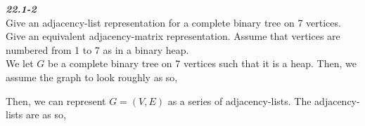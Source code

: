 \documentclass{article}
\begin{document}
\textbf{\textit{22.1-2}}\\
Give an adjacency-list representation for a complete binary tree on 7 vertices. Give
an equivalent adjacency-matrix representation. Assume that vertices are numbered
from 1 to 7 as in a binary heap.\\

We let $G$ be a complete binary tree on 7 vertices such that it is a heap. Then, we assume the graph to look roughly as so,
\begin{center}
\end{center}

Then, we can represent $G = (V, E)$ as a series of adjacency-lists. The adjacency-lists are as so,
\end{document}
